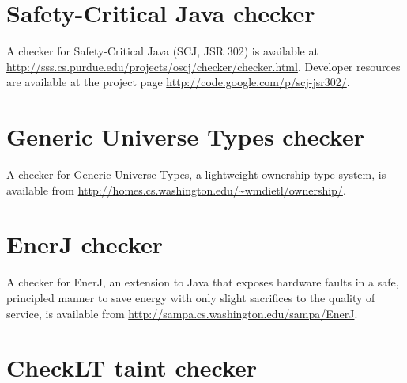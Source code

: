 

\section{Safety-Critical Java checker\label{safety-critical-java-checker}}

A checker for Safety-Critical Java (SCJ, JSR 302) is available at
\url{http://sss.cs.purdue.edu/projects/oscj/checker/checker.html}.
Developer resources are available at the project page
\url{http://code.google.com/p/scj-jsr302/}.







\section{Generic Universe Types checker\label{gut-checker}}

A checker for Generic Universe Types, a lightweight ownership type
system, is available from
\url{http://homes.cs.washington.edu/~wmdietl/ownership/}.


\section{EnerJ checker\label{enerj-checker}}

A checker for EnerJ, an extension to Java that exposes hardware faults
in a safe, principled manner to save energy with only
slight sacrifices to the quality of service, is available from
\url{http://sampa.cs.washington.edu/sampa/EnerJ}.


\section{CheckLT taint checker\label{checklt-checker}}

